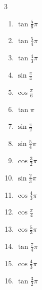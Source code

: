 \begin{multicols}{3}
\begin{enumerate}
  \item $\displaystyle \tan{\frac{5}{6}\pi}$

  \item $\displaystyle \tan{\frac{5}{4}\pi}$
        \phantom{$\displaystyle =1$}

  \item $\displaystyle \tan{\frac{4}{3}\pi}$

  \item $\displaystyle \sin{\frac{\pi}{4}}$

  \item $\displaystyle \cos{\frac{\pi}{6}}$

  \item $\displaystyle \tan{\pi}$
        \phantom{$\displaystyle =0$}

  \item $\displaystyle \sin{\frac{\pi}{2}}$
        \phantom{$\displaystyle =1$}

  \item $\displaystyle \sin{\frac{5}{4}\pi}$

  \item $\displaystyle \cos{\frac{3}{2}\pi}$
        \phantom{$\displaystyle =0$}

  \item $\displaystyle \sin{\frac{2}{3}\pi}$

  \item $\displaystyle \cos{\frac{4}{3}\pi}$

  \item $\displaystyle \cos{\frac{\pi}{4}}$

  \item $\displaystyle \cos{\frac{5}{3}\pi}$

  \item $\displaystyle \tan{\frac{7}{4}\pi}$
        \phantom{$\displaystyle =-1$}

  \item $\displaystyle \cos{\frac{4}{3}\pi}$

  \item $\displaystyle \tan{\frac{3}{2}\pi}$
        \phantom{$\displaystyle \quad なし$}


\end{enumerate}
\end{multicols}
